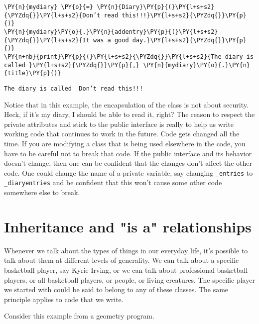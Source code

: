 \begin{Verbatim}[commandchars=\\\{\}]
\PY{n}{mydiary} \PY{o}{=} \PY{n}{Diary}\PY{p}{(}\PY{l+s+s2}{\PYZdq{}}\PY{l+s+s2}{Don’t read this!!!}\PY{l+s+s2}{\PYZdq{}}\PY{p}{)}
\PY{n}{mydiary}\PY{o}{.}\PY{n}{addentry}\PY{p}{(}\PY{l+s+s2}{\PYZdq{}}\PY{l+s+s2}{It was a good day.}\PY{l+s+s2}{\PYZdq{}}\PY{p}{)}
\PY{n+nb}{print}\PY{p}{(}\PY{l+s+s2}{\PYZdq{}}\PY{l+s+s2}{The diary is called }\PY{l+s+s2}{\PYZdq{}}\PY{p}{,} \PY{n}{mydiary}\PY{o}{.}\PY{n}{title}\PY{p}{)}
\end{Verbatim}

\begin{Verbatim}
The diary is called  Don’t read this!!!

\end{Verbatim}


Notice that in this example, the encapsulation of the class is not about security.  Heck, if it’s my diary, I should be able to read it, right?  The reason to respect the private attributes and stick to the public interface is really to help us write working code that continues to work in the future.  Code gets changed all the time.  If you are modifying a class that is being used elsewhere in the code, you have to be careful not to break that code.  If the public interface and its behavior doesn’t change, then one can be confident that the changes don’t affect the other code.  One could change the name of a private variable, say changing \texttt{\_entries} to \texttt{\_diaryentries} and be confident that this won’t cause some other code somewhere else to break.

\section{Inheritance and "is a" relationships}


Whenever we talk about the types of things in our everyday life, it’s possible to talk about them at different levels of generality.  We can talk about a specific basketball player, say Kyrie Irving, or we can talk about professional basketball players, or all basketball players, or people, or living creatures.  The specific player we started with could be said to belong to any of these classes.  The same principle applies to code that we write.  


Consider this example from a geometry program.

